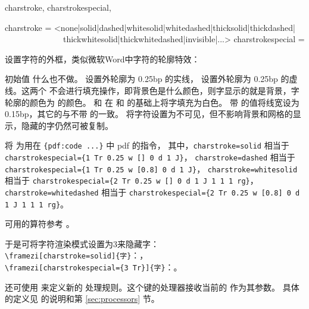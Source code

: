 \documentclass{ctxdoc}
\begin{document}
\begin{function}{
  charstroke,
  charstrokespecial,
  \zitiestrokechars
}
  \begin{syntax}
    charstroke = <none|solid|dashed|whitesolid|whitedashed|thicksolid|thickdashed|
    ~~~~~~~~~~~~~~thickwhitesolid|thickwhitedashed|invisible|...> 
    charstrokespecial = 
      
  \end{syntax}
  设置字符的外框，类似微软Word中字符的轮廓特效：

  初始值  什么也不做。 设置外轮廓为 0.25bp 的实线， 设置外轮廓为 0.25bp 的虚线。这两个
  不会进行填充操作，即背景色是什么颜色，则字显示的就是背景，字轮廓的颜色为  的颜色。 和
   在  和  的基础上将字填充为白色。
  带  的值将线宽设为 0.15bp，其它的与不带  的一致。 将字符设置为不可见，但不影响背景和网格的显示，隐藏的字仍然可被复制。

   将  为用在 \verb|{pdf:code ...}| 中 pdf 的指令，
  其中，\verb|charstroke=solid| 相当于 \verb|charstrokespecial={1 Tr 0.25 w [] 0 d 1 J}|，
  \verb|charstroke=dashed| 相当于 \verb|charstrokespecial={1 Tr 0.25 w [0.8] 0 d 1 J}|，
  \verb|charstroke=whitesolid| 相当于 \verb|charstrokespecial={2 Tr 0.25 w [] 0 d 1 J 1 1 1 rg}|，
  \verb|charstroke=whitedashed| 相当于 \verb|charstrokespecial={2 Tr 0.25 w [0.8] 0 d 1 J 1 1 1 rg}|。
  
   可用的算符参考 \cite{pdfreference}。
\end{function}
  
于是可将字符渲染模式设置为3来隐藏字：\\
\verb|\framezi[charstroke=solid]{字}|：， \\
\verb|\framezi[charstrokespecial={3 Tr}]{字}|：。

还可使用  来定义新的  处理规则。这个键的处理器接收当前的  作为其参数。
具体的定义见  的说明和第 \ref{sec:processors} 节。
\end{document}
